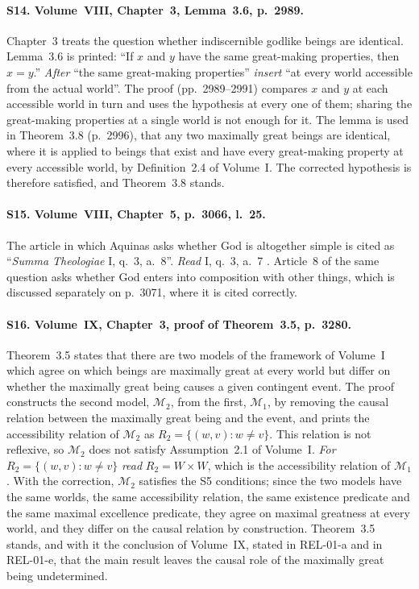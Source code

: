 \documentclass{situationist-preprint}
\begin{document}
\paragraph{S14. Volume~VIII, Chapter~3, Lemma~3.6, p.~2989.} Chapter~3 treats the question whether indiscernible godlike beings are identical. Lemma~3.6 is printed: \enquote{If $x$ and $y$ have the same great-making properties, then $x = y$.} \textit{After} \enquote{the same great-making properties} \textit{insert} \enquote{at every world accessible from the actual world}. The proof (pp.~2989--2991) compares $x$ and $y$ at each accessible world in turn and uses the hypothesis at every one of them; sharing the great-making properties at a single world is not enough for it. The lemma is used in Theorem~3.8 (p.~2996), that any two maximally great beings are identical, where it is applied to beings that exist and have every great-making property at every accessible world, by Definition~2.4 of Volume~I. The corrected hypothesis is therefore satisfied, and Theorem~3.8 stands.

\paragraph{S15. Volume~VIII, Chapter~5, p.~3066, l.~25.} The article in which Aquinas asks whether God is altogether simple is cited as \enquote{\emph{Summa Theologiae} I, q.~3, a.~8}. \textit{Read} I, q.~3, a.~7 \citep{Aquinas}. Article~8 of the same question asks whether God enters into composition with other things, which is discussed separately on p.~3071, where it is cited correctly.

\paragraph{S16. Volume~IX, Chapter~3, proof of Theorem~3.5, p.~3280.} Theorem~3.5 states that there are two models of the framework of Volume~I which agree on which beings are maximally great at every world but differ on whether the maximally great being causes a given contingent event. The proof constructs the second model, $\mathcal{M}_2$, from the first, $\mathcal{M}_1$, by removing the causal relation between the maximally great being and the event, and prints the accessibility relation of $\mathcal{M}_2$ as $R_2 = \{(w,v) : w \neq v\}$. This relation is not reflexive, so $\mathcal{M}_2$ does not satisfy Assumption~2.1 of Volume~I. \textit{For} $R_2 = \{(w,v) : w \neq v\}$ \textit{read} $R_2 = W \times W$, which is the accessibility relation of $\mathcal{M}_1$. With the correction, $\mathcal{M}_2$ satisfies the S5 conditions; since the two models have the same worlds, the same accessibility relation, the same existence predicate and the same maximal excellence predicate, they agree on maximal greatness at every world, and they differ on the causal relation by construction. Theorem~3.5 stands, and with it the conclusion of Volume~IX, stated in REL-01-a and in REL-01-e, that the main result leaves the causal role of the maximally great being undetermined.
\end{document}
